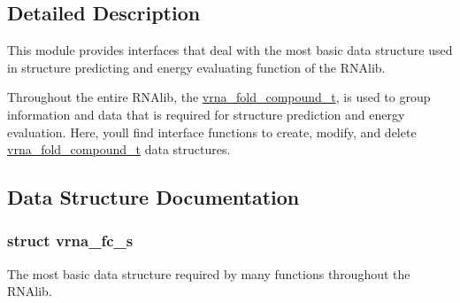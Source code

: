 

\subsection{Detailed Description}
This module provides interfaces that deal with the most basic data structure used in structure predicting and energy evaluating function of the R\+N\+Alib. 

Throughout the entire R\+N\+Alib, the \hyperlink{group__fold__compound_ga1b0cef17fd40466cef5968eaeeff6166}{vrna\+\_\+fold\+\_\+compound\+\_\+t}, is used to group information and data that is required for structure prediction and energy evaluation. Here, you\textquotesingle{}ll find interface functions to create, modify, and delete \hyperlink{group__fold__compound_ga1b0cef17fd40466cef5968eaeeff6166}{vrna\+\_\+fold\+\_\+compound\+\_\+t} data structures. 

\subsection{Data Structure Documentation}
\label{structvrna__fc__s}
\hypertarget{group__fold__compound_structvrna__fc__s}{}
\subsubsection{struct vrna\+\_\+fc\+\_\+s}
The most basic data structure required by many functions throughout the R\+N\+Alib. 

